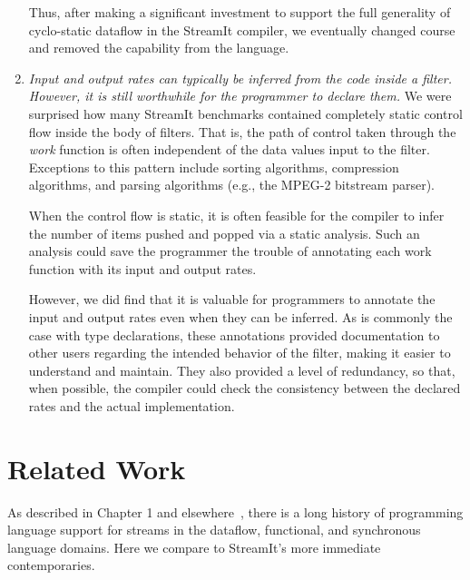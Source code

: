\begin{enumerate}
  Thus, after making a significant investment to support the full
  generality of cyclo-static dataflow in the StreamIt compiler, we
  eventually changed course and removed the capability from the
  language.

\item {\it Input and output rates can typically be inferred from the
  code inside a filter.  However, it is still worthwhile for the
  programmer to declare them.}  We were surprised how many StreamIt
  benchmarks contained completely static control flow inside the body
  of filters.  That is, the path of control taken through the {\it
    work} function is often independent of the data values input to
  the filter.  Exceptions to this pattern include sorting algorithms,
  compression algorithms, and parsing algorithms (e.g., the MPEG-2
  bitstream parser).

  When the control flow is static, it is often feasible for the
  compiler to infer the number of items pushed and popped via a static
  analysis.  Such an analysis could save the programmer the trouble of
  annotating each work function with its input and output rates.

  However, we did find that it is valuable for programmers to annotate
  the input and output rates even when they can be inferred.  As is
  commonly the case with type declarations, these annotations provided
  documentation to other users regarding the intended behavior of the
  filter, making it easier to understand and maintain.  They also
  provided a level of redundancy, so that, when possible, the compiler
  could check the consistency between the declared rates and the
  actual implementation.

\end{enumerate}

\section{Related Work}
\label{sec:lang-related}

As described in Chapter 1 and elsewhere~\cite{survey97}, there is a
long history of programming language support for streams in the
dataflow, functional, and synchronous language domains.  Here we
compare to StreamIt's more immediate contemporaries.

